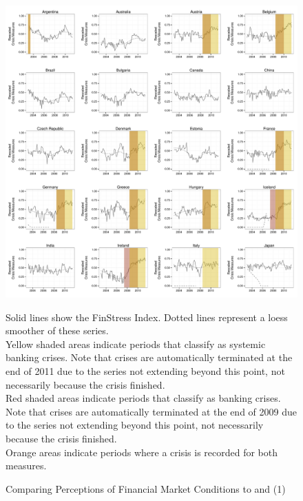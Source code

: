 \documentclass[]{article}
\begin{document}
\begin{figure}
    \caption{Comparing Perceptions of Financial Market Conditions to \cite{laeven2013} and \cite{Reinhart2009} (1)}
    \label{compare_1}
    \begin{center}
        \includegraphics[scale=0.4]{figures/compare_to_lv_rr.pdf}
    \end{center}

    {\tiny{Solid lines show the FinStress Index. Dotted lines represent a loess smoother of these series. \\

    Yellow shaded areas indicate periods that \cite{laeven2013} classify as systemic banking crises. Note that crises are automatically terminated at the end of 2011 due to the series not extending beyond this point, not necessarily because the crisis finished. \\

    Red shaded areas indicate periods that \cite{Reinhart2009} classify as banking crises. Note that crises are automatically terminated at the end of 2009 due to the series not extending beyond this point, not necessarily because the crisis finished. \\

    Orange areas indicate periods where a crisis is recorded for both measures.}}
\end{figure}
\end{document}
